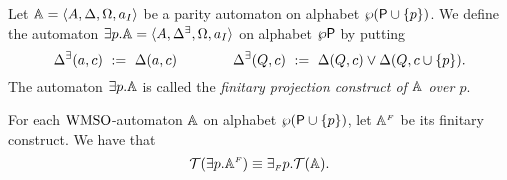 
\begin{definition}\label{DEF_fin_projection}
Let $\mathbb{A} = \langle{A, \Delta, \Omega, a_I}\rangle$ be a parity automaton on alphabet $\wp(\mathsf{P} \cup \{p\})$. We define the automaton ${{\exists} p}.\mathbb{A} = \langle{A, \Delta^\exists, \Omega, a_I}\rangle$ on alphabet $\wp\mathsf{P}$ by putting
\begin{equation*}
  \Delta^\exists(a,c) \ \mathrel{: =} \ \Delta(a,c) \qquad \qquad
  \Delta^\exists(Q,c) \ \mathrel{: =} \ \Delta(Q,c) \vee \Delta(Q,c\cup\{p\}).
\end{equation*}
The automaton ${{\exists} p}.\mathbb{A}$ is called the \emph{finitary projection
construct of $\mathbb{A}$ over $p$}.
\end{definition}


\begin{lemma}\label{PROP_fin_projection} 
For each $\mathrm{WMSO}$-automaton $\mathbb{A}$ on alphabet $\wp (\mathsf{P} \cup \{p\})$, let $\mathbb{A}^{{\scriptscriptstyle F}}$ be its finitary construct. We have that
$$\mathcal{T}({{\exists} p}.\mathbb{A}^{{\scriptscriptstyle F}}) \equiv
{{\exists_{{\scriptscriptstyle F}}} p}.\mathcal{T}(\mathbb{A}).$$
\end{lemma}

